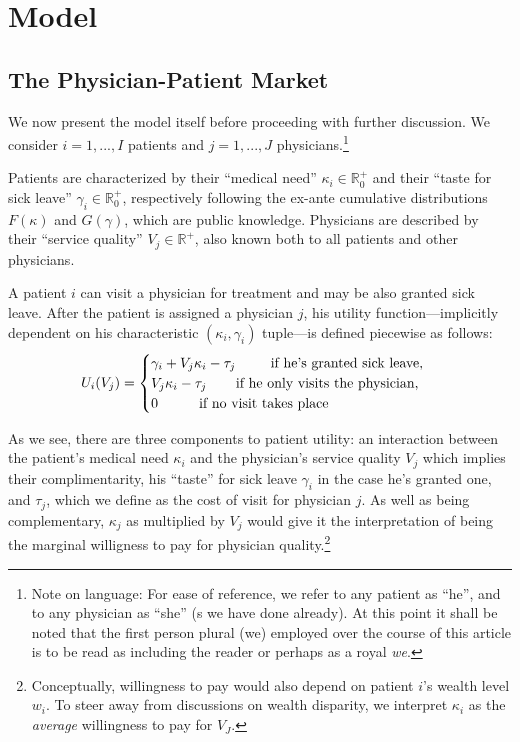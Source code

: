\documentclass[../main.tex]{subfiles}
\begin{document}
\section{Model}

\subsection{The Physician-Patient Market}
\label{sec:3_1}

We now present the model itself before proceeding with further discussion. We consider $i = 1, ..., I$ patients and $j = 1, ..., J$ physicians.\footnote{Note on language: For ease of reference, we refer to any patient as ``he'', and to any physician as ``she'' (s we have done already). At this point it shall be noted that the first person plural (we) employed over the course of this article is to be read as including the reader or perhaps as a royal \textit{we}.}

Patients are characterized by their ``medical need'' $\kappa_i \in \mathbb{R}_0^+$ and their ``taste for sick leave'' $\gamma_i \in \mathbb{R}_0^+$, respectively following the ex-ante cumulative distributions $F(\kappa)$ and $G(\gamma)$, which are public knowledge. Physicians are described by their ``service quality'' $V_j \in \mathbb{R}^+$, also known both to all patients and other physicians.

A patient $i$ can visit a physician for treatment and may be also granted sick leave. After the patient is assigned a physician $j$, his utility function—implicitly dependent on his characteristic $(\kappa_i,\gamma_i)$ tuple—is defined piecewise as follows:
    \[
U_i(V_j) =\begin{cases}
\gamma_i + V_j \kappa_i - \tau_j \text{  \hspace{0.65cm} if he's granted sick leave,} \\
V_j \kappa_i - \tau_j \text{  \hspace{0.5cm} if he only visits the physician,} \\
0 \text{  \hspace{0.8cm} if no visit takes place}
\end{cases}
\]

As we see, there are three components to patient utility: an interaction between the patient's medical need $\kappa_i$ and the physician's service quality $V_j$ which implies their complimentarity, his ``taste'' for sick leave $\gamma_i$ in the case he's granted one, and $\tau_j$, which we define as the cost of visit for physician $j$. As well as being complementary, $\kappa_j$ as multiplied by $V_j$ would give it the interpretation of being the marginal willigness to pay for physician quality.\footnote{Conceptually, willingness to pay would also depend on patient $i$'s wealth level $w_i$. To steer away from discussions on wealth disparity, we interpret $\kappa_i$ as the \textit{average} willingness to pay for $V_J$.}
\end{document}
